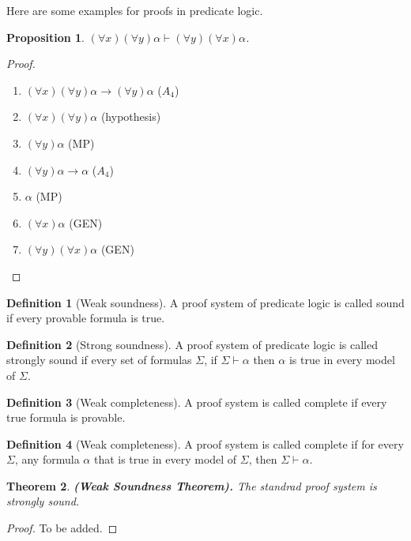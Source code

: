 \documentclass[11pt,a4paper]{article}
\theoremstyle{definition}
\newtheorem{definition}{Definition}[section]
\theoremstyle{plain}
\newtheorem{theorem}{Theorem}[section]
\newtheorem{proposition}[theorem]{Proposition}
\renewcommand{\tt}[1]{\textnormal{\textbf{(#1).}}} %
\renewcommand{\implies}{\rightarrow}
\begin{document}
  Here are some examples for proofs in predicate logic.

  \begin{proposition}
    $(\forall x)(\forall y) \alpha \vdash (\forall y)(\forall x) \alpha$.
  \end{proposition}
  \begin{proof}
    \begin{enumerate}
      \item $(\forall x)(\forall y) \alpha \implies (\forall y) \alpha$ 
        ($A_4$)
      \item $(\forall x)(\forall y) \alpha$ (hypothesis)
      \item $(\forall y) \alpha$ (MP)
      \item $(\forall y) \alpha \implies \alpha$ ($A_4$)
      \item $\alpha$ (MP)
      \item $(\forall x) \alpha$ (GEN)
      \item $(\forall y)(\forall x) \alpha$ (GEN)
    \end{enumerate}
  \end{proof}

  \begin{definition}[Weak soundness]
    A proof system of predicate logic is called sound if every provable 
    formula is true.
  \end{definition}

  \begin{definition}[Strong soundness]
    A proof system of predicate logic is called strongly sound if every 
    set of formulas $\Sigma$, if $\Sigma \vdash \alpha$ then
    $\alpha$ is true in every model of $\Sigma$.
  \end{definition}

  \begin{definition}[Weak completeness]
    A proof system is called complete if every true formula is provable.
  \end{definition}

  \begin{definition}[Weak completeness]
    A proof system is called complete if for every $\Sigma$, any formula 
    $\alpha$ that is true in every model of $\Sigma$, then 
    $\Sigma \vdash \alpha$.
  \end{definition}


  \begin{theorem}\tt{Weak Soundness Theorem}
    The standrad proof system is strongly sound.
  \end{theorem}
  \begin{proof}
    To be added.
  \end{proof}
\end{document}
